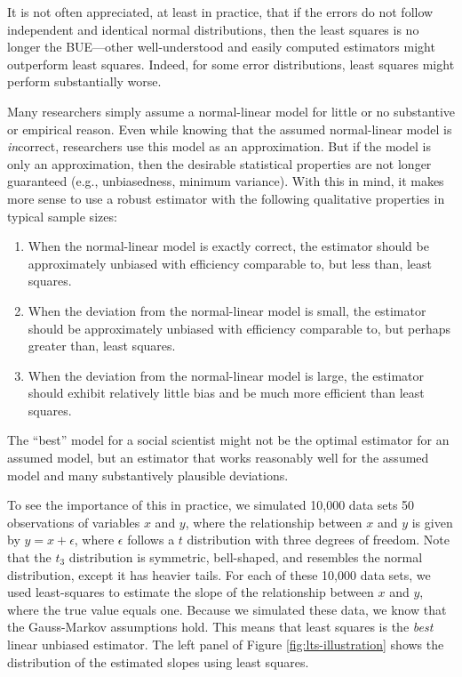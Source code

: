 \documentclass[12pt]{article}
\begin{document}
It is not often appreciated, at least in practice, that if the errors do not follow independent and identical normal distributions, then the least squares is no longer the BUE---other well-understood and easily computed estimators might outperform least squares. 
Indeed, for some error distributions, least squares might perform substantially worse.

Many researchers simply assume a normal-linear model for little or no substantive or empirical reason. 
Even while knowing that the assumed normal-linear model is \textit{in}correct, researchers use this model as an approximation. 
But if the model is only an approximation, then the desirable statistical properties are not longer guaranteed (e.g., unbiasedness, minimum variance). 
With this in mind, it makes more sense to use a robust estimator with the following qualitative properties in typical sample sizes:
\begin{enumerate}
\item When the normal-linear model is exactly correct, the estimator should be approximately unbiased with efficiency comparable to, but less than, least squares.
\item When the deviation from the normal-linear model is small, the estimator should be approximately unbiased with efficiency comparable to, but perhaps greater than, least squares.
\item When the deviation from the normal-linear model is large, the estimator should exhibit relatively little bias and be much more efficient than least squares.
\end{enumerate}
\noindent The ``best'' model for a social scientist might not be the optimal estimator for an assumed model, but an estimator that works reasonably well for the assumed model and many substantively plausible deviations. 

To see the importance of this in practice, we simulated 10,000 data sets 50 observations of variables $x$ and $y$, where the relationship between $x$ and $y$ is given by $y = x + \epsilon$, where $\epsilon$ follows a $t$ distribution with three degrees of freedom. 
Note that the $t_3$ distribution is symmetric, bell-shaped, and resembles the normal distribution, except it has heavier tails. 
For each of these 10,000 data sets, we used least-squares to estimate the slope of the relationship between $x$ and $y$, where the true value equals one. 
Because we simulated these data, we know that the Gauss-Markov assumptions hold. 
This means that least squares is the \textit{best} linear unbiased estimator. 
The left panel of Figure \ref{fig:lts-illustration} shows the distribution of the estimated slopes using least squares.
\end{document}
